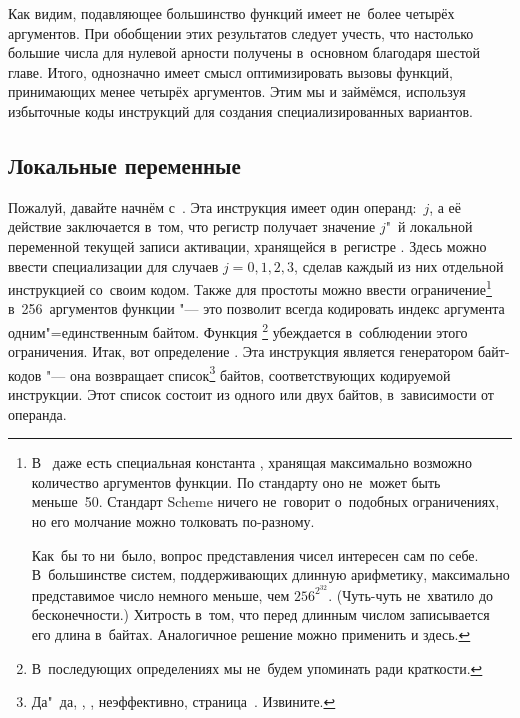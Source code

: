 Как видим, подавляющее большинство функций имеет не~более четырёх аргументов.
При обобщении этих результатов следует учесть, что настолько большие числа для
нулевой арности получены в~основном благодаря шестой главе. Итого, однозначно
имеет смысл оптимизировать вызовы функций, принимающих менее четырёх аргументов.
Этим мы и займёмся, используя избыточные коды инструкций для создания
специализированных вариантов.


\subsection{Локальные переменные}\label{compilation/instructions/ssect:locals}

Пожалуй, давайте начнём с~. Эта инструкция имеет один
операнд:~$j$, а её действие заключается в~том, что регистр  получает
значение $j$"~й локальной переменной текущей записи активации, хранящейся
в~регистре . Здесь можно ввести специализации для случаев $j = 0, 1,
2, 3$, сделав каждый из них отдельной инструкцией со~своим кодом. Также для
простоты можно ввести ограничение\footnote{В~{\CommonLisp} даже есть специальная
константа , хранящая максимально возможно количество
аргументов функции. По стандарту оно не~может быть меньше~50. Стандарт Scheme
ничего не~говорит о~подобных ограничениях, но его молчание можно толковать
по-разному.\par Как~бы то ни~было, вопрос представления чисел интересен сам по
себе. В~большинстве систем, поддерживающих длинную арифметику, максимально
представимое число немного меньше, чем $256^{2^{32}}$. (Чуть-чуть не~хватило до
бесконечности.) Хитрость в~том, что перед длинным числом записывается его длина
в~байтах. Аналогичное решение можно применить и здесь.} в~256~аргументов
функции "--- это позволит всегда кодировать индекс аргумента одним"=единственным
байтом. Функция \footnote{В~последующих определениях мы не~будем
упоминать  ради краткости.} убеждается в~соблюдении этого
ограничения. Итак, вот определение . Эта инструкция
является генератором байт-кодов "--- она возвращает список\footnote{Да"~да,
, , неэффективно,
страница~\pageref{compilation/lang-and-target/par:slowpoke}. Извините.} байтов,
соответствующих кодируемой инструкции. Этот список состоит из одного или двух
байтов, в~зависимости от операнда.

